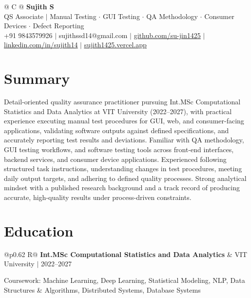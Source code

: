\documentclass[a4paper,10pt]{article}
\newcommand{\ulink}[2]{\href{#1}{\uline{#2}}}
\newcommand{\subheading}[1]{{\color[HTML]{0A0A0A}\fontsize{12}{14}\selectfont\bfseries #1}}
\newcommand{\meta}[1]{{\color[HTML]{5C5C5C}\fontsize{10.5}{12.5}\selectfont #1}}
\begin{document}
\pagestyle{empty}

\begin{tabularx}{\linewidth}{@{} C @{}}
{\color[HTML]{000000}\fontsize{30}{35}\selectfont\bfseries Sujith S} \\[5pt]
{\fontsize{10.5}{12.5}\selectfont\color[HTML]{3A3A3A}
QS Associate $|$ Manual Testing $\cdot$ GUI Testing $\cdot$ QA Methodology $\cdot$ Consumer Devices $\cdot$ Defect Reporting} \\[6pt]
{\fontsize{10.5}{12.5}\selectfont\textcolor[HTML]{3A3A3A}{
+91 9843579926 $|$
sujithssd14@gmail.com $|$
\ulink{https://github.com/su-jin1425}{github.com/su-jin1425} $|$
\ulink{https://linkedin.com/in/sujith14}{linkedin.com/in/sujith14} $|$
\ulink{https://sujith1425.vercel.app}{sujith1425.vercel.app}}}
\end{tabularx}

\vspace{2pt}

\section{Summary}
\vspace{5pt}
{\color[HTML]{0A0A0A}\fontsize{11}{14}\selectfont
Detail-oriented quality assurance practitioner pursuing Int.MSc Computational Statistics and Data Analytics at VIT University (2022--2027), with practical experience executing manual test procedures for GUI, web, and consumer-facing applications, validating software outputs against defined specifications, and accurately reporting test results and deviations. Familiar with QA methodology, GUI testing workflows, and software testing tools across front-end interfaces, backend services, and consumer device applications. Experienced following structured task instructions, understanding changes in test procedures, meeting daily output targets, and adhering to defined quality processes. Strong analytical mindset with a published research background and a track record of producing accurate, high-quality results under process-driven constraints.}

\vspace{2pt}

\section{Education}
\vspace{2pt}

\begin{tabularx}{\linewidth}{@{}p{0.62\linewidth} R@{}}
\subheading{Int.MSc Computational Statistics and Data Analytics} & \meta{VIT University $|$ 2022--2027}
\end{tabularx}
\vspace{1pt}
{\color[HTML]{3A3A3A}\fontsize{11}{14}\selectfont Coursework: Machine Learning, Deep Learning, Statistical Modeling, NLP, Data Structures \& Algorithms, Distributed Systems, Database Systems}
\end{document}
